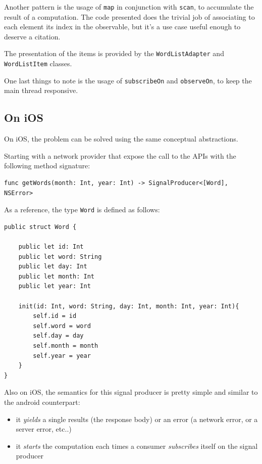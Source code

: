 Another pattern is the usage of \texttt{map} in conjunction with
\texttt{scan}, to accumulate the result of a computation. The code
presented does the trivial job of associating to each element its index
in the observable, but it's a use case useful enough to deserve a
citation.

The presentation of the items is provided by the
\texttt{WordListAdapter} and \texttt{WordListItem} classes.

One last things to note is the usage of \texttt{subscribeOn} and
\texttt{observeOn}, to keep the main thread responsive.

\subsection{On iOS}\label{on-ios}

On iOS, the problem can be solved using the same conceptual
abstractions.

Starting with a network provider that expose the call to the APIs with
the following method signature:

\begin{verbatim}
func getWords(month: Int, year: Int) -> SignalProducer<[Word], NSError>
\end{verbatim}

As a reference, the type \texttt{Word} is defined as follows:

\begin{verbatim}
public struct Word {

    public let id: Int
    public let word: String
    public let day: Int
    public let month: Int
    public let year: Int

    init(id: Int, word: String, day: Int, month: Int, year: Int){
        self.id = id
        self.word = word
        self.day = day
        self.month = month
        self.year = year
    }
}
\end{verbatim}

Also on iOS, the semantics for this signal producer is pretty simple and
similar to the android counterpart:

\begin{itemize}
\itemsep1pt\parskip0pt
\item
  it \emph{yields} a single results (the response body) or an error (a
  network error, or a server error, etc..)
\item
  it \emph{starts} the computation each times a consumer
  \emph{subscribes} itself on the signal producer
\end{itemize}

